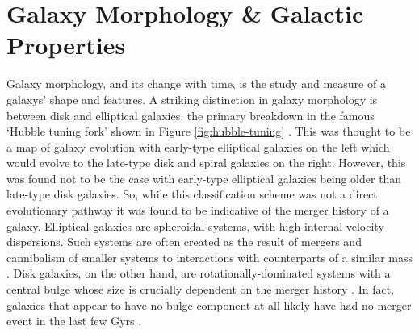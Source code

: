 \section{Galaxy Morphology \& Galactic Properties}\label{galaxy-morphology}
\noindent Galaxy morphology, and its change with time, is the study and measure of a galaxys' shape and features. A striking distinction in galaxy morphology is between disk and elliptical galaxies, the primary breakdown in the famous `Hubble tuning fork' shown in Figure \ref{fig:hubble-tuning} \citep{1936rene.book.....H}. This was thought to be a map of galaxy evolution with early-type elliptical galaxies on the left which would evolve to the late-type disk and spiral galaxies on the right. However, this was found not to be the case with early-type elliptical galaxies being older than late-type disk galaxies. So, while this classification scheme was not a direct evolutionary pathway it was found to be indicative of the merger history of a galaxy. Elliptical galaxies are spheroidal systems, with high internal velocity dispersions. Such systems are often created as the result of mergers and cannibalism of smaller systems to interactions with counterparts of a similar mass \citep{1996MNRAS.283.1361B, 2006MNRAS.366..499D}. Disk galaxies, on the other hand, are rotationally-dominated systems with a central bulge whose size is crucially dependent on the merger history \citep{1992ApJ...393..484B, 2010ApJ...715..202H, 2017ApJ...837L...8B}. In fact, galaxies that appear to have no bulge component at all likely have had no merger event in the last few Gyrs \citep{2012ApJ...756...26M}.

